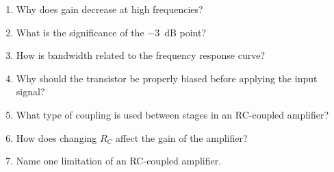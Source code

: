 \begin{enumerate}[label=Q\arabic*.]
	\item Why does gain decrease at high frequencies?
	\item What is the significance of the \SI{-3}{dB} point?
	\item How is bandwidth related to the frequency response curve?
	\item Why should the transistor be properly biased before applying the input signal?
	\item What type of coupling is used between stages in an RC-coupled amplifier?
	\item How does changing $R_C$ affect the gain of the amplifier?
	\item Name one limitation of an RC-coupled amplifier.
\end{enumerate}
